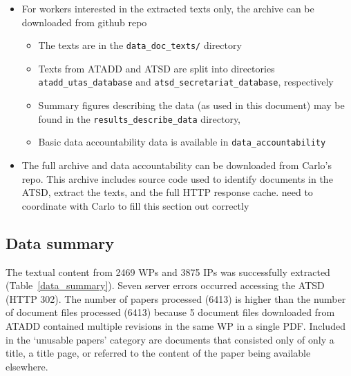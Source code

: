 \documentclass[12pt]{article}
\newcommand{\m}[0]{\color{maroon}}
\begin{document}
\begin{itemize}
    \item For workers interested in the extracted texts only,
    the archive can be downloaded from {\m github repo}
        \begin{itemize}
            \item The texts are in the {\tt data\_doc\_texts/} directory
            \item Texts from ATADD and ATSD are split into 
            directories
            {\tt atadd\_utas\_database} and {\tt atsd\_secretariat\_database},
            respectively
            \item Summary figures describing the data (as used in this document)
            may be found in the {\tt results\_describe\_data} directory,
            \item Basic data accountability data is available in {\tt data\_accountability}
        \end{itemize}
    \item The full archive and data accountability can be downloaded from {\m Carlo's repo}.
    This archive includes source code used to identify documents in the ATSD, 
    extract the texts, and the full HTTP response cache.
    {\m need to coordinate with Carlo to fill this section out correctly}
\end{itemize}

\clearpage
\subsection{Data summary}

The textual content from 2469 WPs and 3875 IPs
was successfully extracted (Table~\ref{data_summary}).
Seven server errors occurred accessing the ATSD (HTTP 302).
The number of papers processed (6413) is higher than the number of
document files processed (6413) because 
5 document files downloaded from ATADD contained multiple revisions 
in the same WP in a single PDF.
Included in the `unusable papers' category
are documents that consisted only of only a title, 
a title page,
or referred to the content of the paper being available elsewhere.
\end{document}
